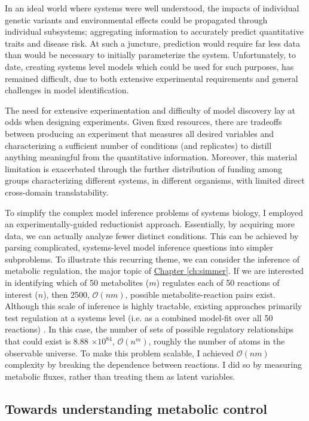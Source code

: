 In an ideal world where systems were well understood, the impacts of individual genetic variants and environmental effects could be propagated through individual subsystems; aggregating information to accurately predict quantitative traits and disease risk.  At such a juncture, prediction would require far less data than would be necessary to initially parameterize the system. Unfortunately, to date, creating systems level models which could be used for such purposes, has remained difficult, due to both extensive experimental requirements and general challenges in model identification.

The need for extensive experimentation and difficulty of model discovery lay at odds when designing experiments. Given fixed resources, there are tradeoffs between producing an experiment that measures all desired variables and characterizing a sufficient number of conditions (and replicates) to distill anything meaningful from the quantitative information. Moreover, this material limitation is exacerbated through the further distribution of funding among groups characterizing different systems, in different organisms, with limited direct cross-domain translatability. 

To simplify the complex model inference problems of systems biology, I employed an experimentally-guided reductionist approach. Essentially, by acquiring more data, we can actually analyze fewer distinct conditions. This can be achieved by parsing complicated, systems-level model inference questions into simpler subproblems. To illustrate this recurring theme, we can consider the inference of metabolic regulation, the major topic of \hyperref[ch:simmer]{Chapter \ref{ch:simmer}}. If we are interested in identifying which of 50 metabolites ($m$) regulates each of 50 reactions of interest ($n$), then 2500, $\mathcal{O}(nm)$, possible metabolite-reaction pairs exist.  Although this scale of inference is highly tractable, existing approaches primarily test regulation at a systems level (i.e. as a combined model-fit over all 50 reactions) \cite{Link:2013dj, Zampar:2013fr}.  In this case, the number of sets of possible regulatory relationships that could exist is 8.88 $\times 10^{84}$, $\mathcal{O}(n^{m})$, roughly the number of atoms in the observable universe. To make this problem scalable, I achieved $\mathcal{O}(nm)$ complexity by breaking the dependence between reactions. I did so by measuring metabolic fluxes, rather than treating them as latent variables.

\subsection{Towards understanding metabolic control}

